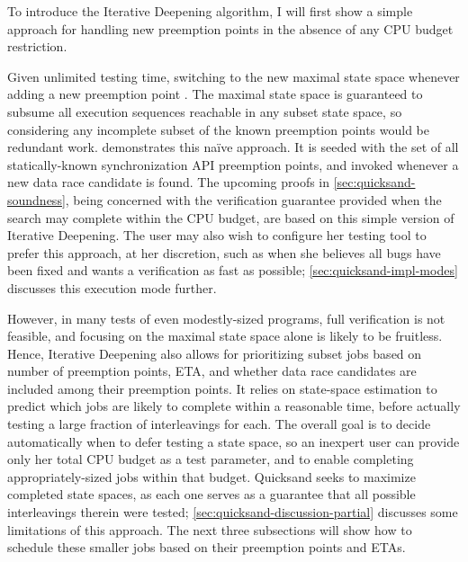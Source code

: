 To introduce the Iterative Deepening algorithm,
I will first show a simple approach for handling new preemption points in the absence of any CPU budget restriction.

Given unlimited testing time, %
switching to the new maximal state space whenever adding a new preemption point
.
The maximal state space is guaranteed to subsume all execution sequences reachable in any subset state space,
so considering any incomplete subset of the known preemption points would be redundant work.
 demonstrates this na\"ive approach.
It is seeded with the set of all statically-known synchronization API preemption points,
and invoked whenever a new data race candidate is found.
%
The upcoming proofs in \cref{sec:quicksand-soundness},
being concerned with the verification guarantee provided when the search may complete within the CPU budget,
are based on this simple version of Iterative Deepening.
The user may also wish to configure her testing tool to prefer this approach, at her discretion,
such as when she believes all bugs have been fixed and wants a verification as fast as possible;
\cref{sec:quicksand-impl-modes} discusses this execution mode further.

However, in many tests of even modestly-sized programs,
full verification is not feasible,
and focusing on the maximal state space alone is likely to be fruitless.
%
Hence, Iterative Deepening also allows for prioritizing subset jobs
based on number of preemption points, ETA, and whether data race candidates are included among their preemption points.
It relies on state-space estimation \cite{estimation}
to predict which jobs are likely to complete within a reasonable time,
before actually testing a large fraction of interleavings for each.
The overall goal is to decide automatically when to defer testing a state space,
so an inexpert user can provide only her total CPU budget as a test parameter,
and to enable completing appropriately-sized jobs within that budget.
Quicksand seeks to maximize completed state spaces,
as each one serves as a guarantee that all possible interleavings therein were tested;
\cref{sec:quicksand-discussion-partial} discusses some limitations of this approach.
The next three subsections will show how to schedule these smaller jobs
based on their preemption points and ETAs.

\newcommand\AllPPs{\ensuremath{\mathcal{A}}}
\newcommand\PendingJobs{\ensuremath{\mathcal{P}}}
\newcommand\SuspendedJobs{\ensuremath{\mathcal{S}}}
\newcommand\GetETA[1]{ETA(#1)}
\newcommand\GetPPSet[1]{PPSet(#1)}

